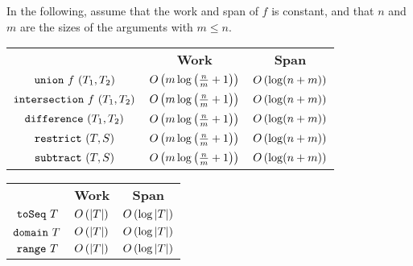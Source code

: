 \begin{costspec}[Combination]
In the following, assume that the work and span of $f$ is constant, and that
$n$ and $m$ are the sizes of the arguments with $m \leq n$.
\begin{tabular}{c|c|c}
& \textbf{Work} & \textbf{Span} \\
$\texttt{union}~f~(T_1, T_2)$ &
$O\left({m \log\left(\frac n m + 1\right)}\right)$ &
$O\left({\log(n + m)}\right)$
\\
$\texttt{intersection}~f~(T_1, T_2)$ &
$O\left({m \log\left(\frac n m + 1\right)}\right)$ &
$O\left({\log(n + m)}\right)$
\\
$\texttt{difference}~(T_1, T_2)$ &
$O\left({m \log\left(\frac n m + 1\right)}\right)$ &
$O\left({\log(n + m)}\right)$
\\
$\texttt{restrict}~(T, S)$ &
$O\left({m \log\left(\frac n m + 1\right)}\right)$ &
$O\left({\log(n + m)}\right)$
\\
$\texttt{subtract}~(T, S)$ &
$O\left({m \log\left(\frac n m + 1\right)}\right)$ &
$O\left({\log(n + m)}\right)$
\end{tabular}
\end{costspec}

\begin{costspec}[Miscellaous]
\begin{tabular}{c|c|c}
& \textbf{Work} & \textbf{Span} \\
$\texttt{toSeq}~T$ & $O\left({|T|}\right)$ & $O\left({\log|T|}\right)$ \\
$\texttt{domain}~T$ & $O\left({|T|}\right)$ & $O\left({\log|T|}\right)$ \\
$\texttt{range}~T$ & $O\left({|T|}\right)$ & $O\left({\log|T|}\right)$
\end{tabular}
\end{costspec}


